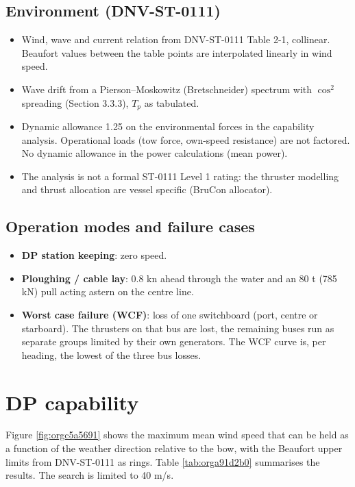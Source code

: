 \documentclass[a4paper,11pt]{article}
\begin{document}
\subsection{Environment (DNV-ST-0111)}
\label{sec:orgec2a0f8}
\begin{itemize}
\item Wind, wave and current relation from DNV-ST-0111 Table 2-1, collinear.  Beaufort
values between the table points are interpolated linearly in wind speed.
\item Wave drift from a Pierson--Moskowitz (Bretschneider) spectrum with \(\cos^2\)
spreading (Section 3.3.3), \(T_p\) as tabulated.
\item Dynamic allowance 1.25 on the environmental forces in the capability analysis.
Operational loads (tow force, own-speed resistance) are not factored.  No dynamic
allowance in the power calculations (mean power).
\item The analysis is not a formal ST-0111 Level 1 rating: the thruster modelling and
thrust allocation are vessel specific (BruCon allocator).
\end{itemize}

\subsection{Operation modes and failure cases}
\label{sec:orge8b1322}
\begin{itemize}
\item \textbf{DP station keeping}: zero speed.
\item \textbf{Ploughing / cable lay}: 0.8 kn ahead through the water and an 80 t (785 kN) pull
acting astern on the centre line.
\item \textbf{Worst case failure (WCF)}: loss of one switchboard (port, centre or starboard).  The
thrusters on that bus are lost, the remaining buses run as separate groups limited by
their own generators.  The WCF curve is, per heading, the lowest of the three bus losses.
\end{itemize}

\section{DP capability}
\label{sec:orgfdc6ef9}

Figure \ref{fig:orgc5a5691} shows the maximum mean wind speed that can be held as a
function of the weather direction relative to the bow, with the Beaufort upper limits
from DNV-ST-0111 as rings.  Table \ref{tab:orga91d2b0} summarises the results.  The search
is limited to 40 m/s.
\end{document}
